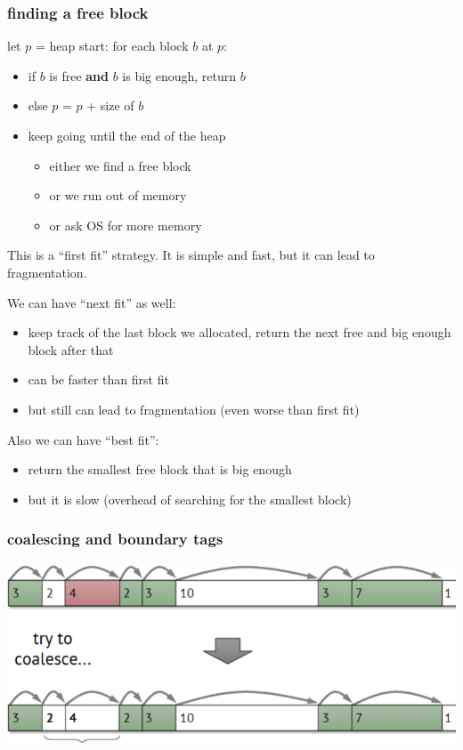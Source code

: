 \documentclass[letterpaper,12pt]{article}
\begin{document}
\subsubsection{finding a free block}
let $p$ = heap start: for each block $b$ at $p$:\begin{itemize}
    \item if $b$ is free \textbf{and} $b$ is big enough, return $b$
    \item else $p$ = $p$ + size of $b$
    \item keep going until the end of the heap \begin{itemize}
              \item either we find a free block
              \item or we run out of memory
              \item or ask OS for more memory
          \end{itemize}
\end{itemize}
This is a ``first fit'' strategy. It is simple and fast, but it can lead to fragmentation.

We can have ``next fit'' as well:\begin{itemize}
    \item keep track of the last block we allocated, return the next free and big enough
          block after that
    \item can be faster than first fit
    \item but still can lead to fragmentation (even worse than first fit)
\end{itemize}

Also we can have ``best fit'':\begin{itemize}
    \item return the smallest free block that is big enough
    \item but it is slow (overhead of searching for the smallest block)
\end{itemize}
\subsubsection{coalescing and boundary tags}
\includegraphics*[scale = 0.7]{./Images/Coalescing.png}
\end{document}
